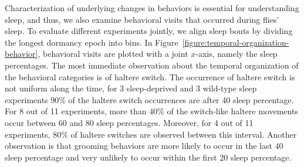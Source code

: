 Characterization of underlying changes in behaviors is essential for understanding sleep, and thus, we also examine behavioral visits that occurred during flies' sleep.
To evaluate different experiments jointly, we align sleep bouts by dividing the longest dormancy epoch into bins.
In Figure~\ref{figure:temporal-organization-behavior}, behavioral visits are plotted with a joint $x$-axis, namely the sleep percentages.
The most immediate observation about the temporal organization of the behavioral categories is of haltere switch.
The occurrence of haltere switch is not uniform along the time, for 3 sleep-deprived and 3 wild-type sleep experiments $90\%$ of the haltere switch occurrences are after $40$ sleep percentage.
For 8 out of 11 experiments, more than $40\%$ of the switch-like haltere movements occur between $60$ and $80$ sleep percentages.
Moreover, for 4 out of 11 experiments, $80\%$ of haltere switches are observed between this interval.
Another observation is that grooming behaviors are more likely to occur in the last $40$ sleep percentage and very unlikely to occur within the first $20$ sleep percentage.
